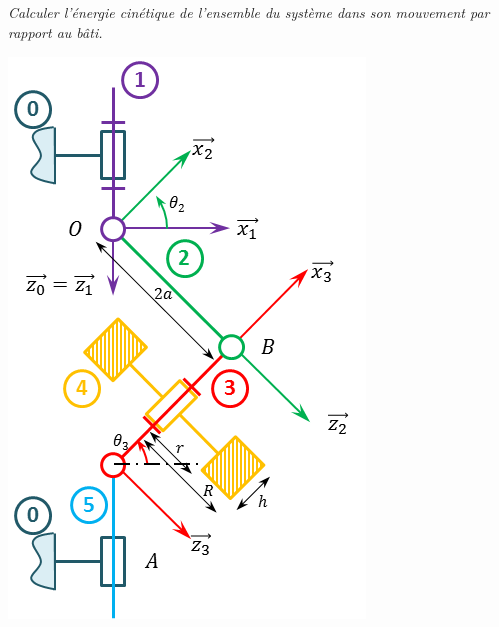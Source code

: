 \documentclass[10pt,fleqn]{article} %
\begin{document}
\begin{multicols}{2}
\subparagraph{}
\textit{Calculer l'énergie cinétique de l'ensemble du système dans son mouvement par rapport au bâti.}
\ifprof
\begin{corrige}
\end{corrige}
\else
\fi



\begin{center}
\includegraphics[width=\linewidth]{images/Schema_Cin.png}
\end{center}


\ifprof
\else
\end{multicols}
\fi
\end{document}
